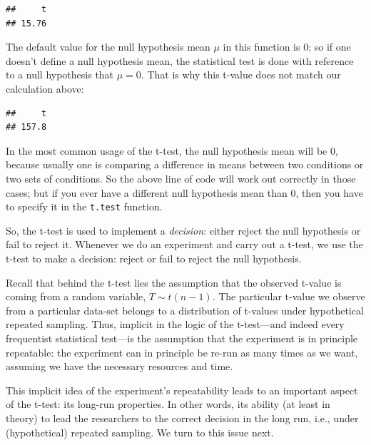 \documentclass[12pt,]{krantz}
\newenvironment{Shaded}{\begin{snugshade}}{\end{snugshade}}
\newcommand{\KeywordTok}[1]{\textcolor[rgb]{0.13,0.29,0.53}{\textbf{#1}}}
\newcommand{\NormalTok}[1]{#1}
\newcommand{\OperatorTok}[1]{\textcolor[rgb]{0.81,0.36,0.00}{\textbf{#1}}}
\begin{document}
\begin{verbatim}
##     t 
## 15.76
\end{verbatim}

The default value for the null hypothesis mean \(\mu\) in this function is 0; so if one doesn't define a null hypothesis mean, the statistical test is done with reference to a null hypothesis that \(\mu=0\). That is why this t-value does not match our calculation above:

\begin{Shaded}
\end{Shaded}

\begin{verbatim}
##     t 
## 157.8
\end{verbatim}

In the most common usage of the t-test, the null hypothesis mean will be \(0\), because usually one is comparing a difference in means between two conditions or two sets of conditions. So the above line of code will work out correctly in those cases; but if you ever have a different null hypothesis mean than \(0\), then you have to specify it in the \texttt{t.test} function.

So, the t-test is used to implement a \emph{decision}: either reject the null hypothesis or fail to reject it. Whenever we do an experiment and carry out a t-test, we use the t-test to make a decision: reject or fail to reject the null hypothesis.

Recall that behind the t-test lies the assumption that the observed t-value is coming from a random variable, \(T\sim t(n-1)\). The particular t-value we observe from a particular data-set belongs to a distribution of t-values under hypothetical repeated sampling. Thus, implicit in the logic of the t-test---and indeed every frequentist statistical test---is the assumption that the experiment is in principle repeatable: the experiment can in principle be re-run as many times as we want, assuming we have the necessary resources and time.

This implicit idea of the experiment's repeatability leads to an important aspect of the t-test: its long-run properties. In other words, its ability (at least in theory) to lead the researchers to the correct decision in the long run, i.e., under (hypothetical) repeated sampling. We turn to this issue next.
\end{document}
